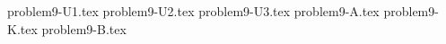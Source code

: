 \documentclass{article}
\begin{document}
{problem9-U1.tex}
{problem9-U2.tex}
{problem9-U3.tex}
{problem9-A.tex}
{problem9-K.tex}
{problem9-B.tex}
\end{document}
